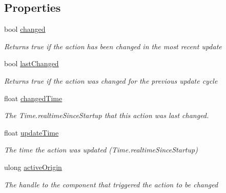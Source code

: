 \subsection*{Properties}
\begin{DoxyCompactItemize}
\item 
bool \mbox{\hyperlink{interface_valve_1_1_v_r_1_1_i_steam_v_r___action___in___source_a709444689c4ec680077a341f6cd7b984}{changed}}
\begin{DoxyCompactList}\small\item\em Returns true if the action has been changed in the most recent update \end{DoxyCompactList}\item 
bool \mbox{\hyperlink{interface_valve_1_1_v_r_1_1_i_steam_v_r___action___in___source_ad31c92ed9c0df791c4cf8f6907dc6d73}{last\+Changed}}
\begin{DoxyCompactList}\small\item\em Returns true if the action was changed for the previous update cycle \end{DoxyCompactList}\item 
float \mbox{\hyperlink{interface_valve_1_1_v_r_1_1_i_steam_v_r___action___in___source_a761752bb73a29d2ee597e71a61476c79}{changed\+Time}}
\begin{DoxyCompactList}\small\item\em The Time.\+realtime\+Since\+Startup that this action was last changed. \end{DoxyCompactList}\item 
float \mbox{\hyperlink{interface_valve_1_1_v_r_1_1_i_steam_v_r___action___in___source_ada770da3da523e6bba5c7b5501a8da9e}{update\+Time}}
\begin{DoxyCompactList}\small\item\em The time the action was updated (Time.\+realtime\+Since\+Startup) \end{DoxyCompactList}\item 
ulong \mbox{\hyperlink{interface_valve_1_1_v_r_1_1_i_steam_v_r___action___in___source_a4aabe825dd43d59f2c23677904f93846}{active\+Origin}}
\begin{DoxyCompactList}\small\item\em The handle to the component that triggered the action to be changed \end{DoxyCompactList}\item 

\end{DoxyCompactItemize}
